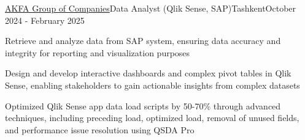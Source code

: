 \begin{resume_employer}{\href{https://www.linkedin.com/company/akfa-group-of-companies}{AKFA Group of Companies}}{Data Analyst (Qlik Sense, SAP)}{Tashkent}{October 2024 - February 2025}
    \item Retrieve and analyze data from SAP system, ensuring data accuracy and integrity for reporting and visualization purposes
    \item Design and develop interactive dashboards and complex pivot tables in Qlik Sense, enabling stakeholders to gain actionable insights from complex datasets
    \item Optimized Qlik Sense app data load scripts by 50-70\% through advanced techniques, including preceding load, optimized load, removal of unused fields, and performance issue resolution using QSDA Pro
 \end{resume_employer}

